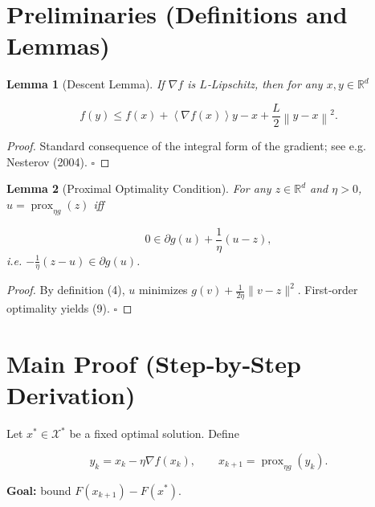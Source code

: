 \documentclass{article}
\newtheorem{lemma}{Lemma}
\newcommand{\prox}{\operatorname{prox}}
\newcommand{\R}{\mathbb{R}}
\newcommand{\norm}[1]{\left\lVert #1\right\rVert}
\newcommand{\inner}[1]{\left\langle #1\right\rangle}
\begin{document}
\newpage
\section*{Preliminaries (Definitions and Lemmas)}
\begin{lemma}[Descent Lemma]\label{lem:descent}
If $\nabla f$ is $L$‑Lipschitz, then for any $x,y\in\R^{d}$  

\[
f(y)\le f(x)+\inner{\nabla f(x)}{y-x}+\frac{L}{2}\norm{y-x}^{2}.
\tag{8}
\]
\end{lemma}
\begin{proof}
Standard consequence of the integral form of the gradient; see e.g. Nesterov (2004). \hfill $\square$
\end{proof}

\begin{lemma}[Proximal Optimality Condition]\label{lem:prox-opt}
For any $z\in\R^{d}$ and $\eta>0$, $u=\prox_{\eta g}(z)$ iff  

\[
0\in \partial g(u)+\frac{1}{\eta}(u-z),
\tag{9}
\]
i.e. $-\frac{1}{\eta}(z-u)\in\partial g(u)$.
\end{lemma}
\begin{proof}
By definition (4), $u$ minimizes $g(v)+\frac{1}{2\eta}\|v-z\|^{2}$. First‑order optimality yields (9). \hfill $\square$
\end{proof}

\section*{Main Proof (Step‑by‑Step Derivation)}
Let $x^{*}\in\mathcal X^{*}$ be a fixed optimal solution.  Define  

\[
y_{k}=x_{k}-\eta\nabla f(x_{k}),\qquad x_{k+1}= \prox_{\eta g}(y_{k}).
\tag{10}
\]

\noindent\textbf{Goal:} bound $F(x_{k+1})-F(x^{*})$.
\end{document}
